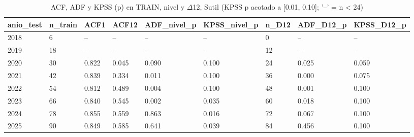 \begin{table}[H]
\centering
\small
\caption{ACF, ADF y KPSS (p) en TRAIN, nivel y $\Delta$12, Sutil (KPSS p acotado a [0.01, 0.10]; '--' = n < 24)}
\label{tab:T04_estacionariedad_sutil}
\begin{tabular}{lllllllll}
\toprule
anio\_test & n\_train & ACF1 & ACF12 & ADF\_nivel\_p & KPSS\_nivel\_p & n\_D12 & ADF\_D12\_p & KPSS\_D12\_p \\
\midrule
2018 & 6 & -- & -- & -- & -- & 0 & -- & -- \\
2019 & 18 & -- & -- & -- & -- & 12 & -- & -- \\
2020 & 30 & 0.822 & 0.045 & 0.090 & 0.100 & 24 & 0.025 & 0.059 \\
2021 & 42 & 0.839 & 0.334 & 0.011 & 0.100 & 36 & 0.000 & 0.075 \\
2022 & 54 & 0.812 & 0.489 & 0.004 & 0.100 & 48 & 0.001 & 0.100 \\
2023 & 66 & 0.840 & 0.545 & 0.002 & 0.035 & 60 & 0.018 & 0.100 \\
2024 & 78 & 0.855 & 0.559 & 0.863 & 0.016 & 72 & 0.067 & 0.100 \\
2025 & 90 & 0.849 & 0.585 & 0.641 & 0.039 & 84 & 0.456 & 0.100 \\
\bottomrule
\end{tabular}
\end{table}